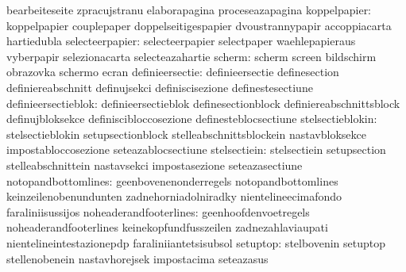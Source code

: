                                   bearbeiteseite                   zpracujstranu
                                  elaborapagina                    proceseazapagina
                    koppelpapier: koppelpapier                     couplepaper
                                  doppelseitigespapier             dvoustrannypapir
                                  accoppiacarta                    hartiedubla
                 selecteerpapier: selecteerpapier                  selectpaper
                                  waehlepapieraus                  vyberpapir
                                  selezionacarta                   selecteazahartie
                          scherm: scherm                           screen
                                  bildschirm                       obrazovka
                                  schermo                          ecran
                 definieersectie: definieersectie                  definesection
                                  definiereabschnitt               definujsekci
                                  definiscisezione                 definestesectiune
             definieersectieblok: definieersectieblok              definesectionblock
                                  definiereabschnittsblock         definujbloksekce
                                  definiscibloccosezione           definesteblocsectiune
                stelsectieblokin: stelsectieblokin                 setupsectionblock
                                  stelleabschnittsblockein         nastavbloksekce
                                  impostabloccosezione             seteazablocsectiune
                    stelsectiein: stelsectiein                     setupsection
                                  stelleabschnittein               nastavsekci
                                  impostasezione                   seteazasectiune
             notopandbottomlines: geenbovenenonderregels           notopandbottomlines
                                  keinzeilenobenundunten           zadnehorniadolniradky
                                  nientelineecimafondo             faraliniisussijos
          noheaderandfooterlines: geenhoofdenvoetregels            noheaderandfooterlines
                                  keinekopfundfusszeilen           zadnezahlaviaupati
                                  nientelineintestazionepdp        faraliniiantetsisubsol
                        setuptop: stelbovenin                      setuptop
                                  stellenobenein                   nastavhorejsek
                                  impostacima                      seteazasus
